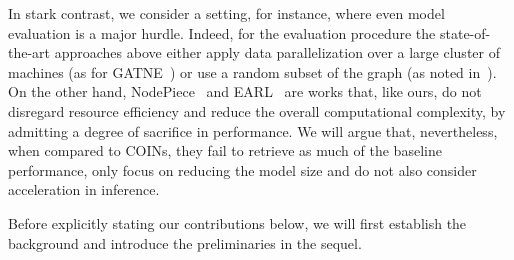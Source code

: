 In stark contrast, we consider a setting, for instance, where even model evaluation is a major hurdle. Indeed, for the evaluation procedure the state-of-the-art approaches above either apply data parallelization over a large cluster of machines (as for GATNE~\cite{cen_representation_2019}) or use a random subset of the graph (as noted in~\cite{ren_smore_2021}). On the other hand, NodePiece~\cite{galkin_nodepiece_2022} and EARL~\cite{chen_entity-agnostic_2023} are works that, like ours, do not disregard resource efficiency and reduce the overall computational complexity, by admitting a degree of sacrifice in performance. We will argue that, nevertheless, when compared to COINs, they fail to retrieve as much of the baseline performance, only focus on reducing the model size and do not also consider acceleration in inference.

Before explicitly stating our contributions below, we will first establish the background and introduce the preliminaries in the sequel. 







 


